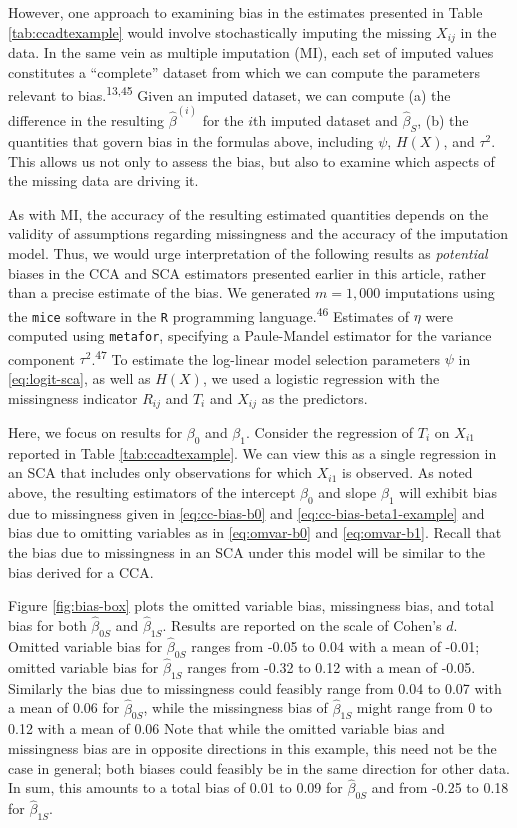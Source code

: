 \documentclass[
]{article}
\begin{document}
However, one approach to examining bias in the estimates presented in Table \ref{tab:ccadtexample} would involve stochastically imputing the missing \(X_{ij}\) in the data.
In the same vein as multiple imputation (MI), each set of imputed values constitutes a ``complete'' dataset from which we can compute the parameters relevant to bias.\textsuperscript{13,45}
Given an imputed dataset, we can compute (a) the difference in the resulting \(\hat{\beta}^{(i)}\) for the \(i\)th imputed dataset and \(\hat{\beta}_S\), (b) the quantities that govern bias in the formulas above, including \(\psi\), \(H(X)\), and \(\tau^2\).
This allows us not only to assess the bias, but also to examine which aspects of the missing data are driving it.

As with MI, the accuracy of the resulting estimated quantities depends on the validity of assumptions regarding missingness and the accuracy of the imputation model.
Thus, we would urge interpretation of the following results as \emph{potential} biases in the CCA and SCA estimators presented earlier in this article, rather than a precise estimate of the bias.
We generated \(m = 1,000\) imputations using the \texttt{mice} software in the \texttt{R} programming language.\textsuperscript{46}
Estimates of \(\eta\) were computed using \texttt{metafor}, specifying a Paule-Mandel estimator for the variance component \(\tau^2\).\textsuperscript{47}
To estimate the log-linear model selection parameters \(\psi\) in \eqref{eq:logit-sca}, as well as \(H(X)\), we used a logistic regression with the missingness indicator \(R_{ij}\) and \(T_i\) and \(X_{ij}\) as the predictors.

Here, we focus on results for \(\beta_0\) and \(\beta_1\).
Consider the regression of \(T_i\) on \(X_{i1}\) reported in Table \ref{tab:ccadtexample}.
We can view this as a single regression in an SCA that includes only observations for which \(X_{i1}\) is observed.
As noted above, the resulting estimators of the intercept \(\beta_0\) and slope \(\beta_1\) will exhibit bias due to missingness given in \eqref{eq:cc-bias-b0} and \eqref{eq:cc-bias-beta1-example} and bias due to omitting variables as in \eqref{eq:omvar-b0} and \eqref{eq:omvar-b1}.
Recall that the bias due to missingness in an SCA under this model will be similar to the bias derived for a CCA.

Figure \ref{fig:bias-box} plots the omitted variable bias, missingness bias, and total bias for both \(\hat{\beta}_{0S}\) and \(\hat{\beta}_{1S}\).
Results are reported on the scale of Cohen's \(d\).
Omitted variable bias for \(\hat{\beta}_{0S}\) ranges from -0.05 to 0.04 with a mean of -0.01; omitted variable bias for \(\hat{\beta}_{1S}\) ranges from -0.32 to 0.12 with a mean of -0.05.
Similarly the bias due to missingness could feasibly range from 0.04 to 0.07 with a mean of 0.06 for \(\hat{\beta}_{0S}\), while the missingness bias of \(\hat{\beta}_{1S}\) might range from 0 to 0.12 with a mean of 0.06
Note that while the omitted variable bias and missingness bias are in opposite directions in this example, this need not be the case in general; both biases could feasibly be in the same direction for other data.
In sum, this amounts to a total bias of 0.01 to 0.09 for \(\hat{\beta}_{0S}\) and from -0.25 to 0.18 for \(\hat{\beta}_{1S}\).
\end{document}
